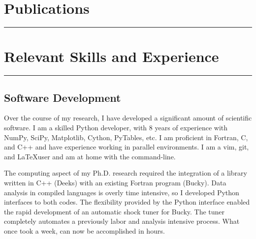 \documentclass[letterpaper,10pt]{article}
\begin{document}
\section*{Publications}
\hrule
\vspace{0.07in}












\section*{Relevant Skills and Experience}
\hrule
\vspace{0.07in}

\subsection*{Software Development}
Over the course of my research, I have developed a significant amount of
scientific software.  I am a skilled Python developer, with 8 years of
experience with NumPy, SciPy, Matplotlib, Cython, PyTables, etc.  I am
proficient in Fortran, C, and C++ and have experience working in parallel
environments.  I am a vim, git, and \LaTeX user and am at home with the
command-line.

The computing aspect of my Ph.D. research required the integration of a library
written in C++ (Deeks) with an existing Fortran program (Bucky).  Data analysis
in compiled languages is overly time intensive, so I developed Python
interfaces to both codes.  The flexibility provided by the Python interface
enabled the rapid development of an automatic shock tuner for Bucky.  The tuner
completely automates a previously labor and analysis intensive process.  What
once took a week, can now be accomplished in hours.
\end{document}

